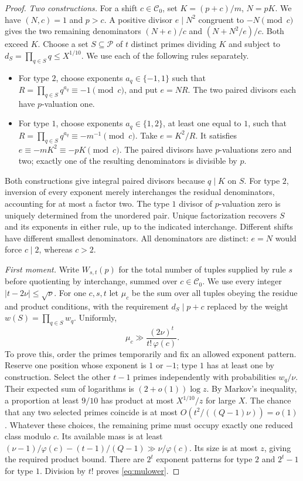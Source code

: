 \documentclass[a4paper,11pt]{article}
\begin{document}
\begin{proof}
\emph{Two constructions.}
For a shift $c\in\mathcal C_0$, set $K=(p+c)/m$, $N=pK$. We have
$(N,c)=1$ and $p>c$. A positive divisor $e\mid N^2$ congruent to
$-N\pmod c$ gives the two remaining denominators $(N+e)/c$ and
$(N+N^2/e)/c$. Both exceed $K$.
Choose a set $S\subseteq\mathcal P$ of $t$ distinct primes dividing $K$
and subject to $d_S=\prod_{q\in S}q\le X^{1/10}$.
We use each of the following rules separately.
\begin{itemize}
\item For type $2$, choose exponents $a_q\in\{-1,1\}$ such that
$R=\prod_{q\in S}q^{a_q}\equiv-1\pmod c$, and put $e=NR$.
The two paired divisors each have $p$-valuation one.
\item For type $1$, choose exponents $a_q\in\{1,2\}$, at least one
equal to $1$, such that $R=\prod_{q\in S}q^{a_q}\equiv-m^{-1}\pmod c$.
Take $e=K^2/R$. It satisfies $e\equiv-mK^2\equiv-pK\pmod c$.
The paired divisors have $p$-valuations zero and two; exactly one
of the resulting denominators is divisible by $p$.
\end{itemize}
Both constructions give integral paired divisors because $q\mid K$ on $S$.
For type $2$, inversion of every exponent merely interchanges the
residual denominators, accounting for at most a factor two. The
type $1$ divisor of $p$-valuation zero is uniquely determined from the
unordered pair. Unique factorization recovers $S$ and its exponents
in either rule, up to the indicated interchange. Different shifts
have different smallest denominators. All denominators are distinct:
$e=N$ would force $c\mid2$, whereas $c>2$.

\emph{First moment.}
Write $W_{s,t}(p)$ for the total number of tuples supplied by rule $s$
before quotienting by interchange, summed over $c\in\mathcal C_0$.
We use every integer $|t-2\nu|\le\sqrt\nu$.
For one $c,s,t$ let $\mu_c$ be the sum over all tuples obeying the
residue and product conditions, with the requirement $d_S\mid p+c$
replaced by the weight $w(S)=\prod_{q\in S}w_q$. Uniformly,
\begin{equation}\label{eq:mulower}
 \mu_c\gg\frac{(2\nu)^t}{t!\,\varphi(c)} .
\end{equation}
To prove this, order the primes temporarily and fix an allowed exponent
pattern. Reserve one position whose exponent is $1$ or $-1$; type $1$
has at least one by construction. Select the other $t-1$ primes
independently with probabilities $w_q/\nu$. Their expected sum of
logarithms is $(2+o(1))\log z$. By Markov's inequality, a proportion
at least $9/10$ has product at most $X^{1/10}/z$ for large $X$.
The chance that any two selected primes coincide is at most
$O(t^2/((Q-1)\nu))=o(1)$. Whatever these choices, the remaining
prime must occupy exactly one reduced class modulo $c$. Its available
mass is at least $(\nu-1)/\varphi(c)-(t-1)/(Q-1)\gg\nu/\varphi(c)$.
Its size is at most $z$, giving the required product bound. There are
$2^t$ exponent patterns for type $2$ and $2^t-1$ for type $1$.
Division by $t!$ proves \eqref{eq:mulower}.


\end{proof}
\end{document}
